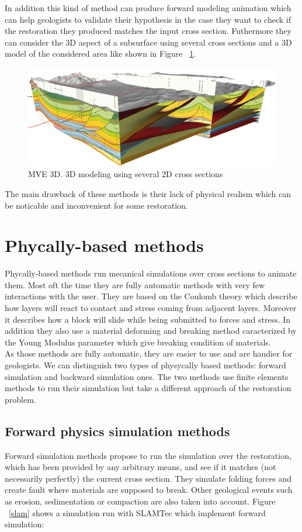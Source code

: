 \documentclass[12pt, a4paper]{report} %
\begin{document}
In addition this kind of method can produce forward modeling animation which can help geologists to validate their hypothesis in the case they want to check if the restoration they produced matches the input cross section. Futhermore they can consider the 3D aspect of a subsurface using several cross sections and a 3D model of the considered area like shown in Figure ~\ref{mve3}.

\begin{figure}[H]
	\centering
	\includegraphics[scale=1]{mve3D.png}
	\caption{MVE 3D. 3D modeling using several 2D cross sections}
	\label{mve3}
\end{figure}


The main drawback of these methods is their lack of physical realism which can be noticable and inconvenient for some restoration.
\section{Phycally-based methods}
Phycally-based methods run mecanical simulations over cross sections to animate them. Most oft the time they are fully automatic methods with very few interactions with the user. They are based on the Coulomb theory which describe how layers will react to contact and stress coming from  adjacent layers. Moreover it describes how a block will slide while being submitted to forces and stress. In addition they also use a material deforming and breaking method caracterized by the Young Modulus parameter which give breaking condition of materials. \\
As those methods are fully automatic, they are easier to use and are handier for geologists.
We can distinguish two types of physycally based methods: forward simulation and backward simulation ones.
The two methods use finite elements methods to run their simulation but take a different approach of the restoration problem.
\subsection{Forward physics simulation methods}
Forward simulation methods propose to run the simulation over the restoration, which has been provided by any arbitrary means, and see if it matches (not necessarily perfectly) the current cross section. They simulate folding forces and create fault where materials are supposed to break. Other geological events such as erosion, sedimentation or compaction are also taken into account. Figure ~\ref{slam} shows a simulation run with SLAMTec \cite{SLAMTec} which implement forward simulation:
\end{document}
